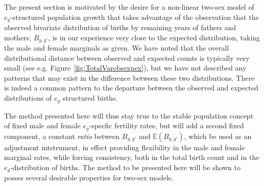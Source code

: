 
The present section is motivated by the desire for a non-linear two-sex model of
$e_y$-structured population growth that takes advantage of the observation that
the observed bivariate distribution of births by remaining years of fathers 
and mothers, $B_{y,y'}$, is in our experience very close to the expected
distribution, taking the male and female marginals as given. We have noted 
that the overall distributional distance
between observed and expected counts is typically very small (see e.g.
Figure~\ref{fig:TotalVarobsexpex}), but we have not described any patterns that
may exist in the difference between these two distributions. There is indeed a
common pattern to the departure between the observed and expected distributions
of $e_y$ structured births.  

The method presented here will thus stay true to the stable population concept
 of fixed male and female $e_y$-specfic fertility rates, but will add a second
 fixed component, a constant \textit{ratio} between $B_{y,y'}$ and
 $\mathbb{E}(B_{y,y'})$, which be used as an adjustment intstrument, in effect
 providing flexibility in the male and female marginal rates, while forcing
 consistency, both in the total birth count and in the $e_y$-distribution of
 births. The method to be presented here will be shown to posses
 several desirable properties for two-sex models.
 
 



